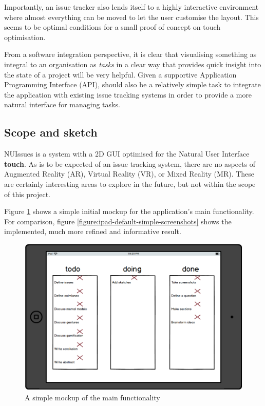 Importantly, an issue tracker also lends itself to a highly interactive environment where almost everything can be moved to let the user customise the layout. This seems to be optimal conditions for a small proof of concept on touch optimisation.

From a software integration perspective, it is clear that visualising something as integral to an organisation as \textit{tasks} in a clear way that provides quick insight into the state of a project will be very helpful. Given a supportive Application Programming Interface (API), should also be a relatively simple task to integrate the application with existing issue tracking systems in order to provide a more natural interface for managing tasks.

\subsection{Scope and sketch}

NUIssues is a system with a 2D GUI optimised for the Natural User Interface \textbf{touch}. As is to be expected of an issue tracking system, there are no aspects of Augmented Reality (AR), Virtual Reality (VR), or Mixed Reality (MR). These are certainly interesting areas to explore in the future, but not within the scope of this project.

Figure \ref{figure:ipad-mockup} shows a simple initial mockup for the application's main functionality. For comparison, figure \ref{figure:ipad-default-simple-screenshots} shows the implemented, much more refined and informative result.

\begin{figure}[H]
    \centerline{\includegraphics[scale=0.4]{images/mockup}}
    \caption{A simple mockup of the main functionality}   
    \label{figure:ipad-mockup}
\end{figure}

